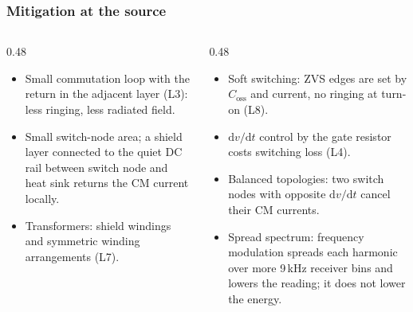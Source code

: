 \begin{frame}
	\frametitle{Mitigation at the source}
	\begin{columns}[T]
		\begin{column}{0.48\textwidth}
			\small
			\begin{itemize}
				\item Small commutation loop with the return in the adjacent layer (L3): less ringing, less radiated field.
				\item Small switch-node area; a shield layer connected to the quiet DC rail between switch node and heat sink returns the CM current locally.
				\item Transformers: shield windings and symmetric winding arrangements (L7).
			\end{itemize}
		\end{column}
		\begin{column}{0.48\textwidth}
			\small
			\begin{itemize}
				\item Soft switching: ZVS edges are set by $C_\mathrm{oss}$ and current, no ringing at turn-on (L8).
				\item $\mathrm{d}v/\mathrm{d}t$ control by the gate resistor costs switching loss (L4).
				\item Balanced topologies: two switch nodes with opposite $\mathrm{d}v/\mathrm{d}t$ cancel their CM currents.
				\item Spread spectrum: frequency modulation spreads each harmonic over more 9\,kHz receiver bins and lowers the reading; it does not lower the energy.
			\end{itemize}
		\end{column}
	\end{columns}
\end{frame}

